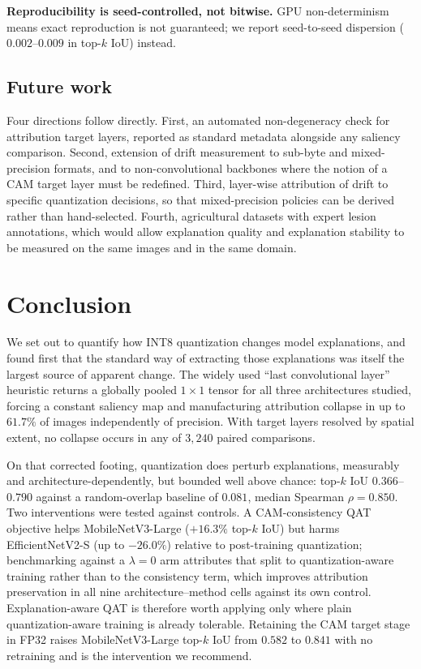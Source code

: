 \documentclass[fleqn,10pt]{wlscirep}
\begin{document}
\textbf{Reproducibility is seed-controlled, not bitwise.} GPU non-determinism means exact reproduction is not guaranteed; we report seed-to-seed dispersion ($0.002$--$0.009$ in top-$k$ IoU) instead.

\subsection*{Future work}

Four directions follow directly. First, an automated non-degeneracy check for attribution target layers, reported as standard metadata alongside any saliency comparison. Second, extension of drift measurement to sub-byte and mixed-precision formats, and to non-convolutional backbones where the notion of a CAM target layer must be redefined. Third, layer-wise attribution of drift to specific quantization decisions, so that mixed-precision policies can be derived rather than hand-selected. Fourth, agricultural datasets with expert lesion annotations, which would allow explanation quality and explanation stability to be measured on the same images and in the same domain.

\section*{Conclusion}

We set out to quantify how INT8 quantization changes model explanations, and found first that the standard way of extracting those explanations was itself the largest source of apparent change. The widely used ``last convolutional layer'' heuristic returns a globally pooled $1 \times 1$ tensor for all three architectures studied, forcing a constant saliency map and manufacturing attribution collapse in up to $61.7\%$ of images independently of precision. With target layers resolved by spatial extent, no collapse occurs in any of $3{,}240$ paired comparisons.

On that corrected footing, quantization does perturb explanations, measurably and architecture-dependently, but bounded well above chance: top-$k$ IoU $0.366$--$0.790$ against a random-overlap baseline of $0.081$, median Spearman $\rho = 0.850$. Two interventions were tested against controls. A CAM-consistency QAT objective helps MobileNetV3-Large ($+16.3\%$ top-$k$ IoU) but harms EfficientNetV2-S (up to $-26.0\%$) relative to post-training quantization; benchmarking against a $\lambda = 0$ arm attributes that split to quantization-aware training rather than to the consistency term, which improves attribution preservation in all nine architecture--method cells against its own control. Explanation-aware QAT is therefore worth applying only where plain quantization-aware training is already tolerable. Retaining the CAM target stage in FP32 raises MobileNetV3-Large top-$k$ IoU from $0.582$ to $0.841$ with no retraining and is the intervention we recommend.
\end{document}
